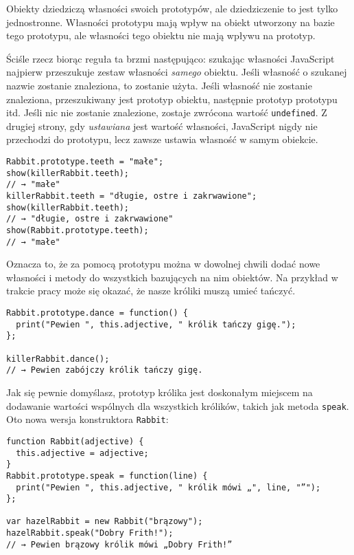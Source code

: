   
Obiekty dziedziczą własności swoich prototypów, ale dziedziczenie to jest tylko jednostronne. Własności prototypu mają wpływ na obiekt utworzony na bazie tego prototypu, ale własności tego obiektu nie mają wpływu na prototyp.

  
Ściśle rzecz biorąc reguła ta brzmi następująco: szukając własności JavaScript najpierw przeszukuje zestaw własności \emph{samego} obiektu. Jeśli własność o szukanej nazwie zostanie znaleziona, to zostanie użyta. Jeśli własność nie zostanie znaleziona, przeszukiwany jest prototyp obiektu, następnie prototyp prototypu itd. Jeśli nic nie zostanie znalezione, zostaje zwrócona wartość \texttt{undefined}. Z drugiej strony, gdy \emph{ustawiana} jest wartość własności, JavaScript nigdy nie przechodzi do prototypu, lecz zawsze ustawia własność w samym obiekcie.

  
\begin{verbatim} 
Rabbit.prototype.teeth = "małe";
show(killerRabbit.teeth);
// → "małe"
killerRabbit.teeth = "długie, ostre i zakrwawione";
show(killerRabbit.teeth);
// → "długie, ostre i zakrwawione"
show(Rabbit.prototype.teeth);
// → "małe"
\end{verbatim}
  
Oznacza to, że za pomocą prototypu można w dowolnej chwili dodać nowe własności i metody do wszystkich bazujących na nim obiektów. Na przykład w trakcie pracy może się okazać, że nasze króliki muszą umieć tańczyć.

  
\begin{verbatim} 
Rabbit.prototype.dance = function() {
  print("Pewien ", this.adjective, " królik tańczy gigę.");
};

killerRabbit.dance();
// → Pewien zabójczy królik tańczy gigę.
\end{verbatim}
  
Jak się pewnie domyślasz, prototyp królika jest doskonałym miejscem na dodawanie wartości wspólnych dla wszystkich królików, takich jak metoda \texttt{speak}. Oto nowa wersja konstruktora \texttt{Rabbit}:

  
\begin{verbatim} 
function Rabbit(adjective) {
  this.adjective = adjective;
}
Rabbit.prototype.speak = function(line) {
  print("Pewien ", this.adjective, " królik mówi „", line, "”");
};

var hazelRabbit = new Rabbit("brązowy");
hazelRabbit.speak("Dobry Frith!");
// → Pewien brązowy królik mówi „Dobry Frith!”
\end{verbatim}


